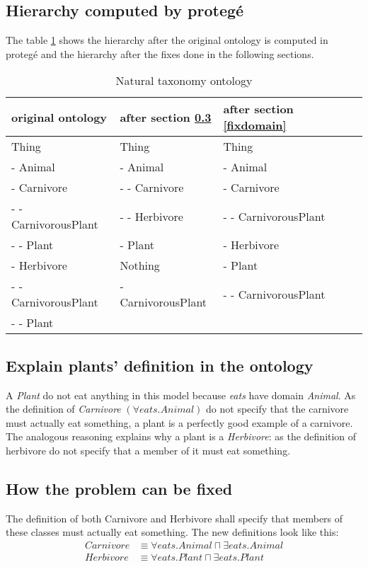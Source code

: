 \documentclass[a4paper,12pt]{article}
\begin{document}
\subsection[Hierarchy]{Hierarchy computed by proteg\'e}
The table \ref{protege} shows the hierarchy after the original ontology is
computed in proteg\'e and the hierarchy after the fixes done in the following
sections.
\begin{table}[!htp]
\centering
\begin{tabular}{|l|l|l|l|}
\hline
original ontology             &
after section \ref{fixforall} &
after section \ref{fixdomain} \\
\hline \hline
Thing                & Thing              & Thing                \\
- Animal             & - Animal           & - Animal             \\
- Carnivore          & - - Carnivore      & - Carnivore          \\
- - CarnivorousPlant & - - Herbivore      & - - CarnivorousPlant \\
- - Plant            & - Plant            & - Herbivore          \\
- Herbivore          & Nothing            & - Plant              \\
- - CarnivorousPlant & - CarnivorousPlant & - - CarnivorousPlant \\
- - Plant            &                    &\\
\hline
\end{tabular}
\caption{Natural taxonomy ontology}
\label{protege}
\end{table}

\subsection[Explain misbehaviour]{Explain plants' definition in the ontology}
A \emph{Plant} do not eat anything in this model because \emph{eats} have
domain \emph{Animal}.  As the definition of \emph{Carnivore} $ (\forall
eats.Animal) $ do not specify that the carnivore must actually eat something, a
plant is a perfectly good example of a carnivore.  The analogous reasoning
explains why a plant is a \emph{Herbivore}: as the definition of herbivore do
not specify that a member of it must eat something.

\subsection[First fix]{How the problem can be fixed}
\label{fixforall}
The definition of both Carnivore and Herbivore shall specify that members of
these classes must actually eat something.  The new definitions look like this:
\begin{align*}
Carnivore &\equiv \forall eats.Animal \sqcap \exists eats.Animal\\
Herbivore &\equiv \forall eats.Plant  \sqcap \exists eats.Plant
\end{align*}
\end{document}

